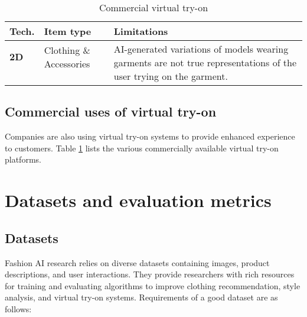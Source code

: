 		\begin{table}[h]
			\caption{Commercial virtual try-on}
			\label{table:commercial-vton}
			\begin{tabularx}{\textwidth}{
				>{\raggedleft\arraybackslash}p{1cm}
				X
				p{\limwidth}
			}
				\toprule
					\textbf{Tech.} &
					\textbf{Item type} &
					\textbf{Limitations} \\
				\midrule
					\textbf{2D} & Clothing \& Accessories & \multirow{4}{\limwidth}{\justifying AI-generated variations of models wearing garments are not true representations of the user trying on the garment.} \\
					& \cite{WalmartA, WalmartB, GoogleShopping} & \\
					& & \\
					& & \\
				\bottomrule
			\end{tabularx}
		\end{table}

	\subsection{Commercial uses of virtual try-on}
		Companies are also using virtual try-on systems to provide enhanced experience to customers. Table \ref{table:commercial-vton} lists the various commercially available virtual try-on platforms.

\section{Datasets and evaluation metrics}
	\subsection{Datasets}
		Fashion AI research relies on diverse datasets containing images, product descriptions, and user interactions. They provide researchers with rich resources for training and evaluating algorithms to improve clothing recommendation, style analysis, and virtual try-on systems. Requirements of a good dataset are as follows:

